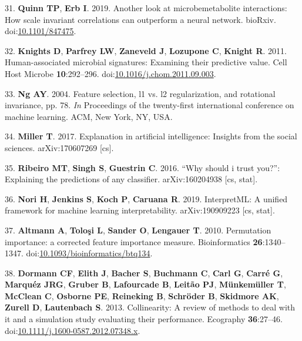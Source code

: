 \documentclass[11pt,]{article}
\begin{document}
\hypertarget{ref-Quinn847475}{}
31. \textbf{Quinn TP}, \textbf{Erb I}. 2019. Another look at
microbemetabolite interactions: How scale invariant correlations can
outperform a neural network. bioRxiv.
doi:\href{https://doi.org/10.1101/847475}{10.1101/847475}.

\hypertarget{ref-knights_human-associated_2011}{}
32. \textbf{Knights D}, \textbf{Parfrey LW}, \textbf{Zaneveld J},
\textbf{Lozupone C}, \textbf{Knight R}. 2011. Human-associated microbial
signatures: Examining their predictive value. Cell Host Microbe
\textbf{10}:292--296.
doi:\href{https://doi.org/10.1016/j.chom.2011.09.003}{10.1016/j.chom.2011.09.003}.

\hypertarget{ref-Ng:2004:FSL:1015330.1015435}{}
33. \textbf{Ng AY}. 2004. Feature selection, l1 vs. l2 regularization,
and rotational invariance, pp. 78. \emph{In} Proceedings of the
twenty-first international conference on machine learning. ACM, New
York, NY, USA.

\hypertarget{ref-miller_explanation_2017}{}
34. \textbf{Miller T}. 2017. Explanation in artificial intelligence:
Insights from the social sciences. arXiv:170607269 {[}cs{]}.

\hypertarget{ref-ribeiro_why_2016}{}
35. \textbf{Ribeiro MT}, \textbf{Singh S}, \textbf{Guestrin C}. 2016.
``Why should i trust you?'': Explaining the predictions of any
classifier. arXiv:160204938 {[}cs, stat{]}.

\hypertarget{ref-nori_interpretml:_2019}{}
36. \textbf{Nori H}, \textbf{Jenkins S}, \textbf{Koch P},
\textbf{Caruana R}. 2019. InterpretML: A unified framework for machine
learning interpretability. arXiv:190909223 {[}cs, stat{]}.

\hypertarget{ref-10.1093ux2fbioinformaticsux2fbtq134}{}
37. \textbf{Altmann A}, \textbf{Toloşi L}, \textbf{Sander O},
\textbf{Lengauer T}. 2010. Permutation importance: a corrected feature
importance measure. Bioinformatics \textbf{26}:1340--1347.
doi:\href{https://doi.org/10.1093/bioinformatics/btq134}{10.1093/bioinformatics/btq134}.

\hypertarget{ref-dormann_collinearity:_2013}{}
38. \textbf{Dormann CF}, \textbf{Elith J}, \textbf{Bacher S},
\textbf{Buchmann C}, \textbf{Carl G}, \textbf{Carré G}, \textbf{Marquéz
JRG}, \textbf{Gruber B}, \textbf{Lafourcade B}, \textbf{Leitão PJ},
\textbf{Münkemüller T}, \textbf{McClean C}, \textbf{Osborne PE},
\textbf{Reineking B}, \textbf{Schröder B}, \textbf{Skidmore AK},
\textbf{Zurell D}, \textbf{Lautenbach S}. 2013. Collinearity: A review
of methods to deal with it and a simulation study evaluating their
performance. Ecography \textbf{36}:27--46.
doi:\href{https://doi.org/10.1111/j.1600-0587.2012.07348.x}{10.1111/j.1600-0587.2012.07348.x}.
\end{document}
